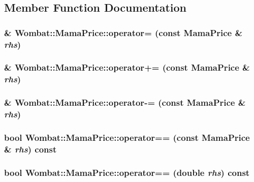 \subsection{Member Function Documentation}
\hypertarget{classWombat_1_1MamaPrice_ab330fbbdb0d1a636281767ef385ac08f}{
\subsubsection[{operator=}]{\& Wombat::MamaPrice::operator= (const {\bf MamaPrice} \& {\em rhs})}}
\label{classWombat_1_1MamaPrice_ab330fbbdb0d1a636281767ef385ac08f}
\hypertarget{classWombat_1_1MamaPrice_aff458c469ce08054c6d84b800386a767}{
\subsubsection[{operator+=}]{\& Wombat::MamaPrice::operator+= (const {\bf MamaPrice} \& {\em rhs})}}
\label{classWombat_1_1MamaPrice_aff458c469ce08054c6d84b800386a767}
\hypertarget{classWombat_1_1MamaPrice_a8192e31ba6e1642348a1ac65367f1688}{
\subsubsection[{operator-\/=}]{\& Wombat::MamaPrice::operator-\/= (const {\bf MamaPrice} \& {\em rhs})}}
\label{classWombat_1_1MamaPrice_a8192e31ba6e1642348a1ac65367f1688}
\hypertarget{classWombat_1_1MamaPrice_a1cdef67308318e12d2f7222c26034315}{
\subsubsection[{operator==}]{\setlength{\rightskip}{0pt plus 5cm}bool Wombat::MamaPrice::operator== (const {\bf MamaPrice} \& {\em rhs}) const}}
\label{classWombat_1_1MamaPrice_a1cdef67308318e12d2f7222c26034315}
\hypertarget{classWombat_1_1MamaPrice_aa5ec5a6cedaee2998ebec7e08515b27c}{
\subsubsection[{operator==}]{\setlength{\rightskip}{0pt plus 5cm}bool Wombat::MamaPrice::operator== (double {\em rhs}) const}}
